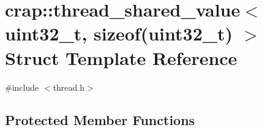 \hypertarget{structcrap_1_1thread__shared__value_3_01uint32__t_00_01sizeof_07uint32__t_08_01_4}{\section{crap\+:\+:thread\+\_\+shared\+\_\+value$<$ uint32\+\_\+t, sizeof(uint32\+\_\+t) $>$ Struct Template Reference}
\label{structcrap_1_1thread__shared__value_3_01uint32__t_00_01sizeof_07uint32__t_08_01_4}
}


{\ttfamily \#include $<$thread.\+h$>$}

\subsection*{Protected Member Functions}
